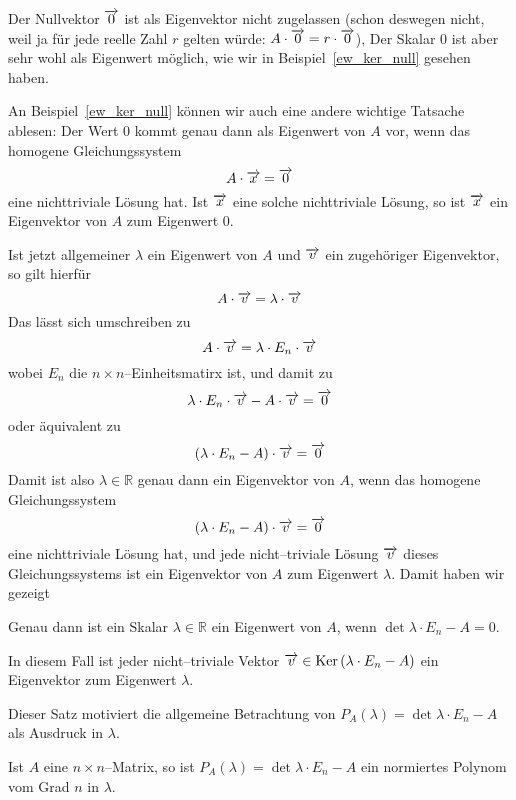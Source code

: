 \begin{notiz} Der Nullvektor $\overrightarrow{0}$ ist als Eigenvektor nicht zugelassen 
(schon deswegen nicht, weil ja für jede reelle Zahl $r$ gelten würde: $A \cdot 
\overrightarrow{0} = r \cdot \overrightarrow{0}$), Der Skalar $0$ ist aber sehr wohl 
als Eigenwert möglich, wie wir in Beispiel~\ref{ew_ker_null} gesehen haben.
\end{notiz}

An Beispiel~\ref{ew_ker_null} können wir auch eine andere wichtige Tatsache 
ablesen: Der Wert $0$ kommt genau dann als Eigenwert von $A$ vor, wenn das homogene 
Gleichungssystem 
  	$$ A \cdot \overrightarrow{x} = \overrightarrow{0} $$
eine nichttriviale Lösung hat. Ist $\overrightarrow{x}$ eine solche nichttriviale 
Lösung, so ist $\overrightarrow{x}$ ein Eigenvektor von $A$ zum Eigenwert $0$.

Ist jetzt allgemeiner $\lambda$ ein Eigenwert von $A$ und $\overrightarrow{v}$ ein 
zugehöriger Eigenvektor, so gilt hierfür
  	$$ A \cdot \overrightarrow{v} = \lambda \cdot \overrightarrow{v} $$
Das lässt sich umschreiben zu 
  	$$ A \cdot \overrightarrow{v} = \lambda \cdot E_n \cdot \overrightarrow{v} $$
wobei $E_n$ die $n \times n$--Einheitsmatirx ist, und damit zu
  	$$ \lambda \cdot E_n \cdot \overrightarrow{v} - A \cdot \overrightarrow{v} = \overrightarrow{0} $$
oder äquivalent zu 
  	$$ \left( \lambda \cdot E_n - A \right) \cdot \overrightarrow{v} = \overrightarrow{0} $$
Damit ist also $\lambda \in \mathbb R$ genau dann ein Eigenvektor von $A$, wenn das 
homogene Gleichungssystem
  	$$ \left( \lambda \cdot E_n - A  \right) \cdot \overrightarrow{v} = \overrightarrow{0} $$
eine nichttriviale Lösung hat, und jede nicht--triviale Lösung 
$\overrightarrow{v}$ dieses Gleichungssystems ist ein Eigenvektor von $A$ zum 
Eigenwert $\lambda$. Damit haben wir gezeigt

\begin{satz} Genau dann ist ein Skalar $\lambda \in \mathbb R$ ein Eigenwert von $A$, wenn
$\det{\lambda \cdot E_n - A } = 0$. 

In diesem Fall ist jeder nicht--triviale Vektor $\overrightarrow{v} \in 
\mathrm{Ker}\left( \lambda \cdot E_n - A \right)$ ein Eigenvektor zum Eigenwert 
$\lambda$.
\end{satz}

Dieser Satz motiviert die allgemeine Betrachtung von $P_A(\lambda) = 
\det{ \lambda \cdot E_n - A }$ als Ausdruck in $\lambda$.

\begin{satz}\label{ew_char_pol} 
Ist $A$ eine $n \times n$--Matrix, so ist $P_A(\lambda) = 
\det{ \lambda \cdot E_n - A }$ ein normiertes Polynom  
vom Grad $n$ in $\lambda$.
\end{satz}

